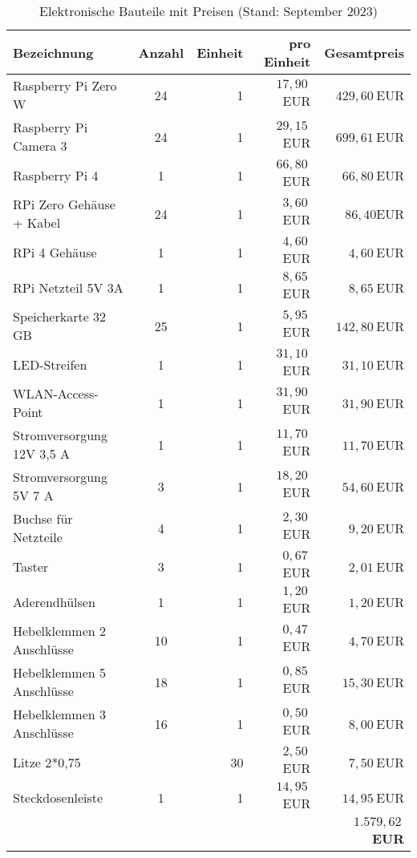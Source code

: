 \documentclass[./00PhotoBox.tex]{subfiles}
\begin{document}
\begin{table}[ht]
    \centering
    \begin{tabular}{l|c|r|r|r}
        Bezeichnung               & Anzahl & Einheit & pro Einheit & Gesamtpreis             \\
        \hline
        Raspberry Pi Zero W       & 24     & 1       & $17,90~$EUR & $429,60~$EUR            \\
        Raspberry Pi Camera 3     & 24     & 1       & $29,15~$EUR & $699,61~$EUR            \\
        Raspberry Pi 4            & 1      & 1       & $66,80~$EUR & $66,80~$EUR             \\
        RPi Zero Gehäuse + Kabel  & 24     & 1       & $3,60~$EUR  & $86,40$EUR              \\
        RPi 4 Gehäuse             & 1      & 1       & $4,60~$EUR  & $4,60~$EUR              \\
        RPi  Netzteil 5V 3A       & 1      & 1       & $8,65~$EUR  & $8,65~$EUR              \\
        Speicherkarte 32 GB       & 25     & 1       & $5,95~$EUR  & $142,80~$EUR            \\
        LED-Streifen              & 1      & 1       & $31,10~$EUR & $31,10~$EUR             \\
        WLAN-Access-Point         & 1      & 1       & $31,90~$EUR & $31,90~$EUR             \\
        Stromversorgung 12V 3,5 A & 1      & 1       & $11,70~$EUR & $11,70~$EUR             \\
        Stromversorgung 5V 7 A    & 3      & 1       & $18,20~$EUR & $54,60~$EUR             \\
        Buchse für Netzteile      & 4      & 1       & $2,30~$EUR  & $9,20~$EUR              \\
        Taster                    & 3      & 1       & $0,67~$EUR  & $2,01~$EUR              \\
        Aderendhülsen             & 1      & 1       & $1,20~$EUR  & $1,20~$EUR              \\
        Hebelklemmen 2 Anschlüsse & 10     & 1       & $0,47~$EUR  & $4,70~$EUR              \\
        Hebelklemmen 5 Anschlüsse & 18     & 1       & $0,85~$EUR  & $15,30~$EUR             \\
        Hebelklemmen 3 Anschlüsse & 16     & 1       & $0,50~$EUR  & $8,00~$EUR              \\
        Litze 2*0,75              &        & 30      & $2,50~$EUR  & $7,50~$EUR              \\
        Steckdosenleiste          & 1      & 1       & $14,95~$EUR & $14,95~$EUR             \\

                                  &        &         &             & \textbf{$1.579,62~$EUR} \\
    \end{tabular}
    \caption{Elektronische Bauteile mit Preisen (Stand: September 2023)}
    \label{tab:bauteile_elektronisch}
\end{table}
\end{document}

